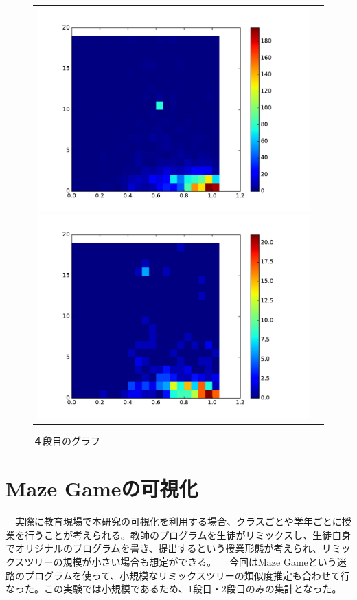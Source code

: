 \documentclass[a4paper,10pt,onecolumn,oneside,openany]{jsbook}
\begin{document}
\begin{figure}[h]
\begin{tabular}{cc}
 	\begin{minipage}[t]{0.45\hsize}
	 \centering
	 \includegraphics[keepaspectratio, scale = 0.35]{colormap_splite_3.pdf}
	 \caption{３段目のグラフ}
	 \label{third_splite_color}
	\end{minipage}
        \begin{minipage}[t]{0.45\hsize}
	 \centering
	 \includegraphics[keepaspectratio, scale = 0.35]{colormap_splite_4.pdf}
	 \caption{４段目のグラフ}
	 \label{fourth_splite_color}
	\end{minipage}
 \end{tabular}
 \end{figure}
 
 \section{Maze Gameの可視化}
　実際に教育現場で本研究の可視化を利用する場合、クラスごとや学年ごとに授業を行うことが考えられる。教師のプログラムを生徒がリミックスし、生徒自身でオリジナルのプログラムを書き、提出するという授業形態が考えられ、リミックスツリーの規模が小さい場合も想定ができる。
　今回はMaze Gameという迷路のプログラムを使って、小規模なリミックスツリーの類似度推定も合わせて行なった。この実験では小規模であるため、1段目・2段目のみの集計となった。
\end{document}
